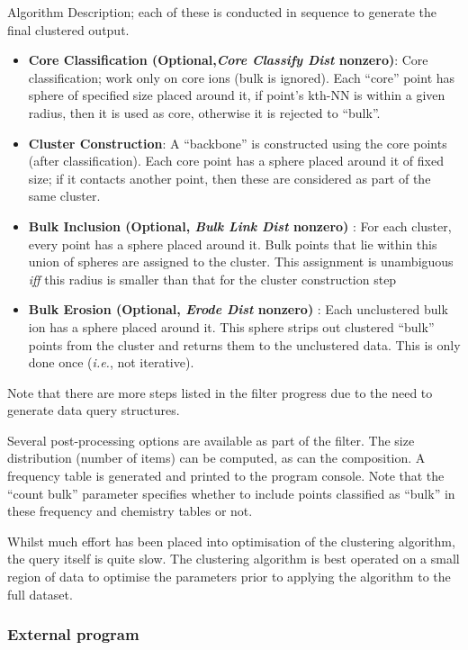 \documentclass[10pt]{article}
\begin{document}
Algorithm Description; each of these is conducted in sequence to generate the final clustered output.
\begin{itemize}
 \item \textbf{Core Classification (Optional,\emph{Core Classify Dist} nonzero)}: Core classification; work only on core ions (bulk is ignored). Each ``core'' point has sphere of specified size placed around it, if point's kth-NN is within a given radius, then it is used as core, otherwise it is rejected to ``bulk''.

 \item \textbf{Cluster Construction}: A ``backbone'' is constructed using the core points (after classification). Each core point has a sphere placed around it of fixed size; if it  contacts another point, then these are considered as part of the same cluster.
 \item \textbf{Bulk Inclusion (Optional, \emph{Bulk Link Dist} nonzero)} : For each cluster, every point has a sphere placed around it. Bulk points that lie within this union of spheres are assigned to the cluster. This assignment is unambiguous \emph{iff} this radius is smaller than that for the cluster construction step
 \item \textbf{Bulk Erosion (Optional, \emph{Erode Dist} nonzero)} : Each unclustered bulk ion has a sphere placed around it. This sphere strips out clustered ``bulk'' points from the cluster and returns them to the unclustered data. This is only done once (\emph{i.e.}, not iterative).
\end{itemize}

Note that there are more steps listed in the filter progress due to the need to generate data query structures.

Several post-processing options are available as part of the filter. The size distribution (number of items) can be computed, as can the composition. A frequency table is generated and printed to the program console. Note that the ``count bulk'' parameter specifies whether to include points classified as ``bulk'' in these frequency and chemistry tables or not.

Whilst much effort has been placed into optimisation of the clustering algorithm, the query itself is quite slow. The clustering algorithm is best operated on a small region of data to optimise the parameters prior to applying the algorithm to the full dataset.

 
\subsubsection{External program}
 
\end{document}
